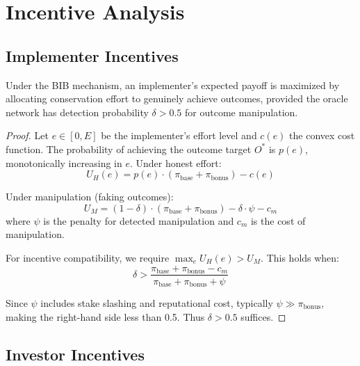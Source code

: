 \section{Incentive Analysis}

\label{sec:incentives}

\subsection{Implementer Incentives}

\begin{theorem}
Under the BIB mechanism, an implementer's expected payoff is maximized
by allocating conservation effort to genuinely achieve outcomes, provided
the oracle network has detection probability $\delta > 0.5$ for outcome
manipulation.
\end{theorem}

\begin{proof}
Let $e \in [0, E]$ be the implementer's effort level and $c(e)$ the
convex cost function. The probability of achieving the outcome target
$O^*$ is $p(e)$, monotonically increasing in $e$. Under honest effort:
\begin{equation}
  U_H(e) = p(e) \cdot (\pi_{\text{base}} + \pi_{\text{bonus}}) - c(e)
\end{equation}

Under manipulation (faking outcomes):
\begin{equation}
  U_M = (1 - \delta) \cdot (\pi_{\text{base}} + \pi_{\text{bonus}})
  - \delta \cdot \psi - c_m
\end{equation}
where $\psi$ is the penalty for detected manipulation and $c_m$ is the
cost of manipulation.

For incentive compatibility, we require $\max_e U_H(e) > U_M$. This
holds when:
\begin{equation}
  \delta > \frac{\pi_{\text{base}} + \pi_{\text{bonus}} - c_m}
  {\pi_{\text{base}} + \pi_{\text{bonus}} + \psi}
\end{equation}

Since $\psi$ includes stake slashing and reputational cost, typically
$\psi \gg \pi_{\text{bonus}}$, making the right-hand side less than
0.5. Thus $\delta > 0.5$ suffices.
\end{proof}

\subsection{Investor Incentives}

